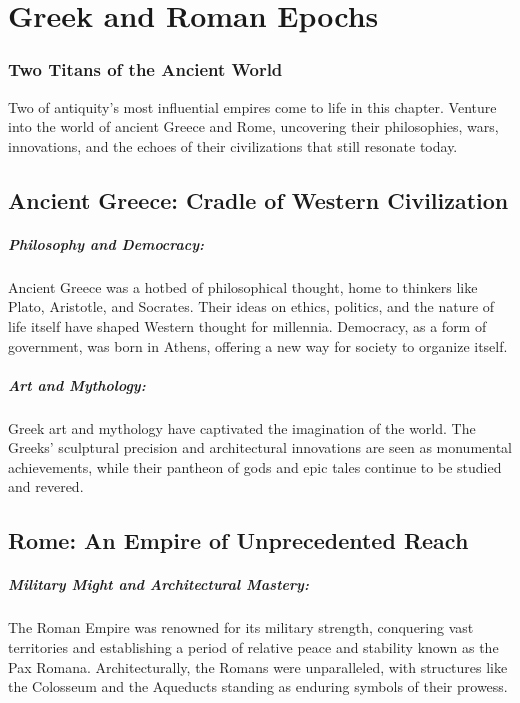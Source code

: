 \documentclass[a4paper,12pt]{book}
\begin{document}
\chapter{Greek and Roman Epochs}
\subsection*{Two Titans of the Ancient World}
Two of antiquity's most influential empires come to life in this chapter. Venture into the world of ancient Greece and Rome, uncovering their philosophies, wars, innovations, and the echoes of their civilizations that still resonate today.

\section*{Ancient Greece: Cradle of Western Civilization}

\paragraph{Philosophy and Democracy:}
Ancient Greece was a hotbed of philosophical thought, home to thinkers like Plato, Aristotle, and Socrates. Their ideas on ethics, politics, and the nature of life itself have shaped Western thought for millennia. Democracy, as a form of government, was born in Athens, offering a new way for society to organize itself.

\paragraph{Art and Mythology:}
Greek art and mythology have captivated the imagination of the world. The Greeks’ sculptural precision and architectural innovations are seen as monumental achievements, while their pantheon of gods and epic tales continue to be studied and revered.

\section*{Rome: An Empire of Unprecedented Reach}

\paragraph{Military Might and Architectural Mastery:}
The Roman Empire was renowned for its military strength, conquering vast territories and establishing a period of relative peace and stability known as the Pax Romana. Architecturally, the Romans were unparalleled, with structures like the Colosseum and the Aqueducts standing as enduring symbols of their prowess.
\end{document}
